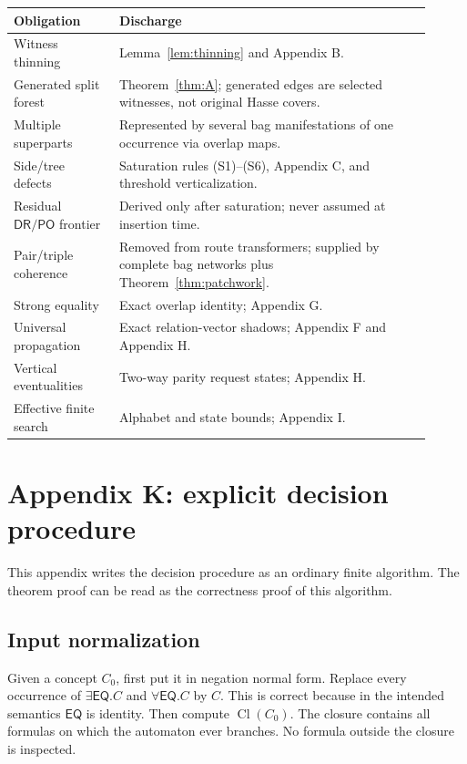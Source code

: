\documentclass[11pt]{article}
\newcommand{\EQ}{\mathsf{EQ}}
\newcommand{\PO}{\mathsf{PO}}
\newcommand{\DR}{\mathsf{DR}}
\newcommand{\Cl}{\operatorname{Cl}}
\begin{document}
\begin{longtable}{p{0.23\linewidth}p{0.68\linewidth}}
\toprule
Obligation & Discharge\\
\midrule
Witness thinning & Lemma~\ref{lem:thinning} and Appendix B.\\
Generated split forest & Theorem~\ref{thm:A}; generated edges are selected witnesses, not original Hasse covers.\\
Multiple superparts & Represented by several bag manifestations of one occurrence via overlap maps.\\
Side/tree defects & Saturation rules (S1)--(S6), Appendix C, and threshold verticalization.\\
Residual $\DR/\PO$ frontier & Derived only after saturation; never assumed at insertion time.\\
Pair/triple coherence & Removed from route transformers; supplied by complete bag networks plus Theorem~\ref{thm:patchwork}.\\
Strong equality & Exact overlap identity; Appendix G.\\
Universal propagation & Exact relation-vector shadows; Appendix F and Appendix H.\\
Vertical eventualities & Two-way parity request states; Appendix H.\\
Effective finite search & Alphabet and state bounds; Appendix I.\\
\bottomrule
\end{longtable}



\section{Appendix K: explicit decision procedure}

This appendix writes the decision procedure as an ordinary finite algorithm.  The theorem proof can be read as the correctness proof of this algorithm.

\subsection{Input normalization}

Given a concept $C_0$, first put it in negation normal form.  Replace every occurrence of $\exists\EQ.C$ and $\forall\EQ.C$ by $C$.  This is correct because in the intended semantics $\EQ$ is identity.  Then compute $\Cl(C_0)$.  The closure contains all formulas on which the automaton ever branches.  No formula outside the closure is inspected.
\end{document}
